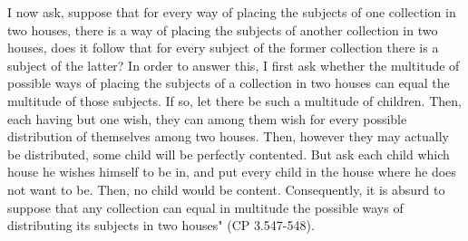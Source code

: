 \documentclass[12pt]{article}
\begin{document}
{I now ask, suppose that for every way of placing the subjects of one collection in two houses, there is a way of placing the subjects of another collection in two houses, does it follow that for every subject of the former collection there is a subject of the latter? In order to answer this, I first ask whether the multitude of possible ways of placing the subjects of a collection in two houses can equal the multitude of those subjects. If so, let there be such a multitude of children. Then, each having but one wish, they can among them wish for every possible distribution of themselves among two houses. Then, however they may actually be distributed, some child will be perfectly contented. But ask each child which house he wishes himself to be in, and put every child in the house where he does not want to be. Then, no child would be content. Consequently, it is absurd to suppose that any collection can equal in multitude the possible ways of distributing its subjects in two houses" (CP 3.547-548).} 
\end{document}
